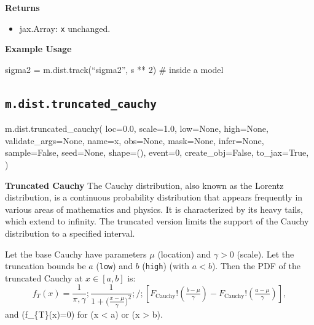\documentclass[
  letterpaper,
  DIV=11,
  numbers=noendperiod]{scrartcl}
\newenvironment{Shaded}{\begin{snugshade}}{\end{snugshade}}
\newcommand{\DecValTok}[1]{\textcolor[rgb]{0.68,0.00,0.00}{#1}}
\newcommand{\FloatTok}[1]{\textcolor[rgb]{0.68,0.00,0.00}{#1}}
\newcommand{\NormalTok}[1]{\textcolor[rgb]{0.00,0.23,0.31}{#1}}
\newcommand{\OperatorTok}[1]{\textcolor[rgb]{0.37,0.37,0.37}{#1}}
\newcommand{\StringTok}[1]{\textcolor[rgb]{0.13,0.47,0.30}{#1}}
\newcommand{\VariableTok}[1]{\textcolor[rgb]{0.07,0.07,0.07}{#1}}
\providecommand{\tightlist}{%
  \setlength{\itemsep}{0pt}\setlength{\parskip}{0pt}}\usepackage{longtable,booktabs,array}
\begin{document}
\textbf{Returns}

\begin{itemize}
\tightlist
\item
  jax.Array: \texttt{x} unchanged.
\end{itemize}

\textbf{Example Usage}

sigma2 = m.dist.track(``sigma2'', s ** 2) \# inside a model

\subsection{\texorpdfstring{\texttt{m.dist.truncated\_cauchy}}{m.dist.truncated\_cauchy}}\label{truncated_cauchy}

\begin{Shaded}
\begin{Highlighting}[]
\NormalTok{m.dist.truncated\_cauchy(}
\NormalTok{    loc}\OperatorTok{=}\FloatTok{0.0}\NormalTok{,}
\NormalTok{    scale}\OperatorTok{=}\FloatTok{1.0}\NormalTok{,}
\NormalTok{    low}\OperatorTok{=}\VariableTok{None}\NormalTok{,}
\NormalTok{    high}\OperatorTok{=}\VariableTok{None}\NormalTok{,}
\NormalTok{    validate\_args}\OperatorTok{=}\VariableTok{None}\NormalTok{,}
\NormalTok{    name}\OperatorTok{=}\StringTok{\textquotesingle{}x\textquotesingle{}}\NormalTok{,}
\NormalTok{    obs}\OperatorTok{=}\VariableTok{None}\NormalTok{,}
\NormalTok{    mask}\OperatorTok{=}\VariableTok{None}\NormalTok{,}
\NormalTok{    infer}\OperatorTok{=}\VariableTok{None}\NormalTok{,}
\NormalTok{    sample}\OperatorTok{=}\VariableTok{False}\NormalTok{,}
\NormalTok{    seed}\OperatorTok{=}\VariableTok{None}\NormalTok{,}
\NormalTok{    shape}\OperatorTok{=}\NormalTok{(),}
\NormalTok{    event}\OperatorTok{=}\DecValTok{0}\NormalTok{,}
\NormalTok{    create\_obj}\OperatorTok{=}\VariableTok{False}\NormalTok{,}
\NormalTok{    to\_jax}\OperatorTok{=}\VariableTok{True}\NormalTok{,}
\NormalTok{)}
\end{Highlighting}
\end{Shaded}

\textbf{Truncated Cauchy} The Cauchy distribution, also known as the
Lorentz distribution, is a continuous probability distribution that
appears frequently in various areas of mathematics and physics. It is
characterized by its heavy tails, which extend to infinity. The
truncated version limits the support of the Cauchy distribution to a
specified interval.

Let the base Cauchy have parameters \(\mu\) (location) and
\(\gamma > 0\) (scale). Let the truncation bounds be \(a\)
(\texttt{low}) and \(b\) (\texttt{high}) (with \(a < b\)). Then the PDF
of the truncated Cauchy at \(x \in [a,b]\) is: \[
f_{T}(x) = \frac{1}{\pi,\gamma};\frac{1}{1 + \bigl(\tfrac{x - \mu}{\gamma}\bigr)^2} ;\Bigg/ ; \left[F_{\mathrm{Cauchy}}!\left(\tfrac{b - \mu}{\gamma}\right) - F_{\mathrm{Cauchy}}!\left(\tfrac{a - \mu}{\gamma}\right)\right],
\] and (f\_\{T\}(x)=0) for (x \textless{} a) or (x \textgreater{} b).
\end{document}
